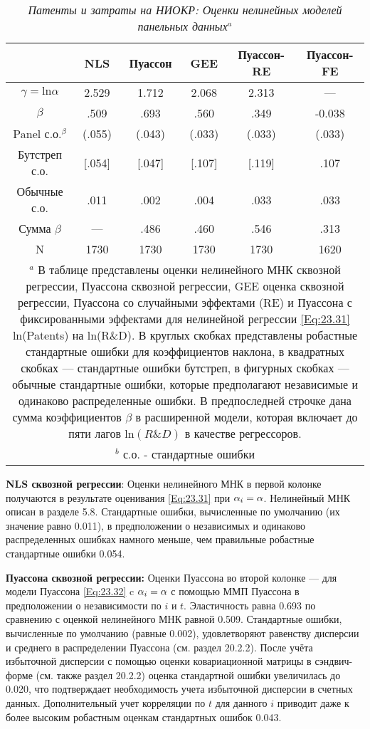 \begin{table}[ht]
\caption{{\it Патенты и затраты на НИОКР: Оценки нелинейных моделей панельных данных}$^a$} 
\centering
\begin{tabular}{c|c|c|c|c|c}
\hline \hline
  & \textbf{NLS} & \textbf{Пуассон} & \textbf{GEE} & \textbf{Пуассон-RE} & \textbf{Пуассон-FE} \\ 
\hline 
$\gamma=\mathrm{ln}\alpha$ & 2.529 & 1.712 & 2.068 & 2.313 & --- \\ 
$\beta$ & .509 & .693 & .560 & .349 & -0.038 \\  
Panel с.о.$^\beta$ & (.055) & (.043) & (.033) & (.033) & (.033) \\ 
Бутстреп с.о. & [.054] & [.047] & [.107] & [.119] & {.107} \\ 
Обычные с.о. & {.011} & {.002} & {.004} & {.033} & {.033} \\ 
Сумма $\beta$ & --- & .486 & .460 & .546 & .313 \\ 
N & 1730 & 1730 & 1730 & 1730 & 1620 \\ 
\hline \hline
\multicolumn{6}{p{15cm}}{${}^a$ В таблице представлены оценки нелинейного МНК сквозной регрессии, Пуассона сквозной регрессии, GEE оценка сквозной регрессии, Пуассона со случайными эффектами (RE) и Пуассона с фиксированными эффектами для нелинейной регрессии \ref{Eq:23.31} ln(Patents) на ln(R\&D). В круглых скобках представлены робастные стандартные ошибки для коэффициентов наклона, в квадратных скобках --- стандартные ошибки бутстреп, в фигурных скобках --- обычные стандартные ошибки, которые предполагают независимые и одинаково распределенные ошибки. В предпоследней строчке дана сумма коэффициентов $\beta$ в расширенной модели, которая включает до пяти лагов $\mathrm{ln}(R \& D)$ в качестве регрессоров.} \\
\multicolumn{6}{p{15cm}}{$^b$ с.о. - стандартные ошибки}
\end{tabular} 
\label{Tab:23.1}
\end{table}

\textbf{NLS сквозной регрессии}: Оценки нелинейного МНК в первой колонке получаются в результате оценивания \ref{Eq:23.31} при $\alpha_i=\alpha$. Нелинейный МНК описан в  разделе 5.8. Стандартные ошибки, вычисленные по умолчанию (их значение равно 0.011), в предположении о независимых и одинаково распределенных ошибках намного меньше, чем правильные робастные стандартные ошибки 0.054.

\textbf{Пуассона сквозной регрессии:} Оценки Пуассона во второй колонке --- для модели Пуассона \ref{Eq:23.32} c $\alpha_i=\alpha$ с помощью ММП Пуассона в предположении о независимости по $i$ и $t$. Эластичность равна 0.693 по сравнению с оценкой нелинейного МНК равной 0.509. Стандартные ошибки, вычисленные по умолчанию (равные 0.002), удовлетворяют равенству дисперсии и среднего в распределении Пуассона (см. раздел 20.2.2). После учёта избыточной дисперсии с помощью оценки ковариационной матрицы в сэндвич-форме  (см. также раздел 20.2.2) оценка стандартной ошибки увеличилась до 0.020, что подтверждает необходимость учета избыточной дисперсии в счетных данных. Дополнительный учет корреляции по $t$ для данного $i$ приводит даже к более высоким робастным оценкам стандартных ошибок 0.043.

